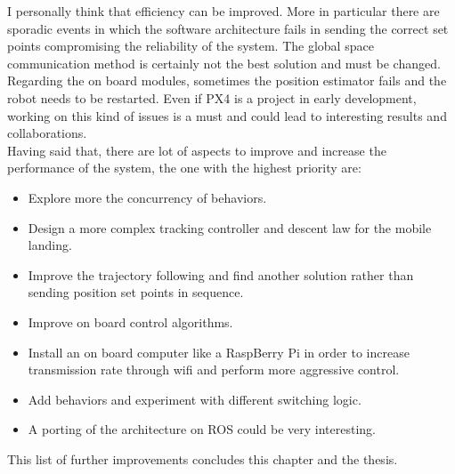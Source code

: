 \noindent
I personally think that efficiency can be improved. More in particular there are sporadic events in which the software architecture fails in sending the correct set points compromising the reliability of the system. The global space communication method is certainly not the best solution and must be changed. Regarding the on board modules, sometimes the position estimator fails and the robot needs to be restarted. Even if PX4 is a project in early development, working on this kind of issues is a must and could lead to interesting results and collaborations. \\

\noindent
Having said that, there are lot of aspects to improve and increase the performance of the system, the one with the highest priority are:
\begin{itemize}
\item Explore more the concurrency of behaviors.
\item Design a more complex tracking controller and descent law for the mobile landing.
\item Improve the trajectory following and find another solution rather than sending position set points in sequence.
\item Improve on board control algorithms.
\item Install an on board computer like a RaspBerry Pi in order to increase transmission rate through wifi and perform more aggressive control.
\item Add behaviors and experiment with different switching logic.
\item A porting of the architecture on ROS could be very interesting. 
\end{itemize}
This list of further improvements concludes this chapter and the thesis.